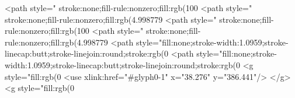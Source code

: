 <path style=" stroke:none;fill-rule:nonzero;fill:rgb(100%
<path style=" stroke:none;fill-rule:nonzero;fill:rgb(4.998779%
<path style=" stroke:none;fill-rule:nonzero;fill:rgb(100%
<path style=" stroke:none;fill-rule:nonzero;fill:rgb(4.998779%
<path style="fill:none;stroke-width:1.0959;stroke-linecap:butt;stroke-linejoin:round;stroke:rgb(0%
<path style="fill:none;stroke-width:1.0959;stroke-linecap:butt;stroke-linejoin:round;stroke:rgb(0%
<g style="fill:rgb(0%
  <use xlink:href="#glyph0-1" x="38.276" y="386.441"/>
</g>
<g style="fill:rgb(0%

